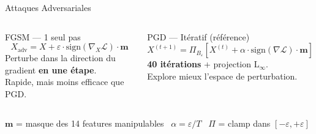\documentclass[aspectratio=169,11pt]{beamer}
\begin{document}
\begin{frame}{Attaques Adversariales}
\begin{columns}[T]
\begin{block}{FGSM --- 1 seul pas}
\[
X_{\text{adv}} = X + \varepsilon \cdot \text{sign}(\nabla_X \mathcal{L}) \cdot \mathbf{m}
\]
Perturbe dans la direction du gradient \textbf{en une \'etape}.\\
Rapide, mais moins efficace que PGD.
\end{block}

\begin{block}{PGD --- It\'eratif (r\'ef\'erence)}
\[
X^{(t+1)} = \Pi_{B_\varepsilon}\!\left[X^{(t)} + \alpha \cdot \text{sign}(\nabla \mathcal{L}) \cdot \mathbf{m}\right]
\]
\textbf{40 it\'erations} + projection L$_\infty$.\\
Explore mieux l'espace de perturbation.
\end{block}
\end{columns}

\vspace{0.6em}
\begin{center}
\footnotesize
$\mathbf{m}$ = masque des 14 features manipulables \textbullet\
$\alpha = \varepsilon/T$ \textbullet\
$\Pi$ = clamp dans $[-\varepsilon,+\varepsilon]$
\end{center}
\end{frame}
\end{document}
